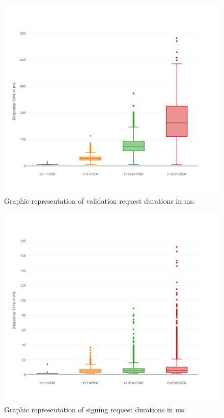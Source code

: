 \documentclass[a4paper,12pt]{scrartcl}
\begin{document}
\begin{figure}[H]
\centering
\includegraphics[width=350pt]{Images/ValidateRequestDurations.png}
\caption{Graphic representation of validation request durations in ms.}
\label{fig:ValidateRequestDurations}
\end{figure}

\begin{figure}[H]
\centering
\includegraphics[width=350pt]{Images/SignRequestDurations.png}
\caption{Graphic representation of signing request durations in ms.}
\label{fig:SignRequestDurations}
\end{figure}
\end{document}
